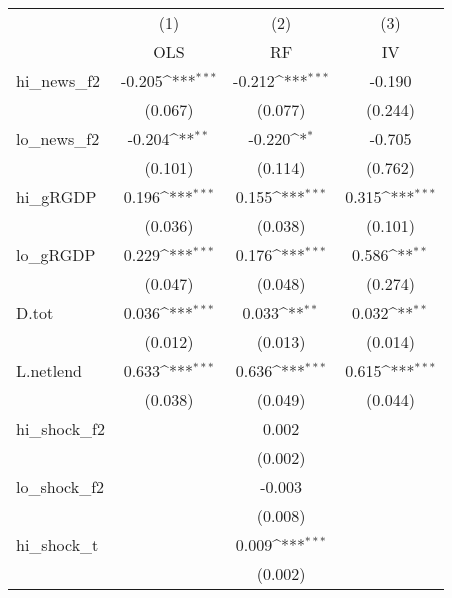 {
\def\sym#1{\ifmmode^{#1}\else\(^{#1}\)\fi}
\begin{tabular}{l*{3}{c}}
\toprule
            &\multicolumn{1}{c}{(1)}&\multicolumn{1}{c}{(2)}&\multicolumn{1}{c}{(3)}\\
            &\multicolumn{1}{c}{OLS}&\multicolumn{1}{c}{RF}&\multicolumn{1}{c}{IV}\\
\midrule
hi\_news\_f2  &      -0.205\sym{***}&      -0.212\sym{***}&      -0.190         \\
            &     (0.067)         &     (0.077)         &     (0.244)         \\
\addlinespace
lo\_news\_f2  &      -0.204\sym{**} &      -0.220\sym{*}  &      -0.705         \\
            &     (0.101)         &     (0.114)         &     (0.762)         \\
\addlinespace
hi\_gRGDP    &       0.196\sym{***}&       0.155\sym{***}&       0.315\sym{***}\\
            &     (0.036)         &     (0.038)         &     (0.101)         \\
\addlinespace
lo\_gRGDP    &       0.229\sym{***}&       0.176\sym{***}&       0.586\sym{**} \\
            &     (0.047)         &     (0.048)         &     (0.274)         \\
\addlinespace
D.tot       &       0.036\sym{***}&       0.033\sym{**} &       0.032\sym{**} \\
            &     (0.012)         &     (0.013)         &     (0.014)         \\
\addlinespace
L.netlend   &       0.633\sym{***}&       0.636\sym{***}&       0.615\sym{***}\\
            &     (0.038)         &     (0.049)         &     (0.044)         \\
\addlinespace
hi\_shock\_f2 &                     &       0.002         &                     \\
            &                     &     (0.002)         &                     \\
\addlinespace
lo\_shock\_f2 &                     &      -0.003         &                     \\
            &                     &     (0.008)         &                     \\
\addlinespace
hi\_shock\_t  &                     &       0.009\sym{***}&                     \\
            &                     &     (0.002)         &                     \\

\end{tabular}}
